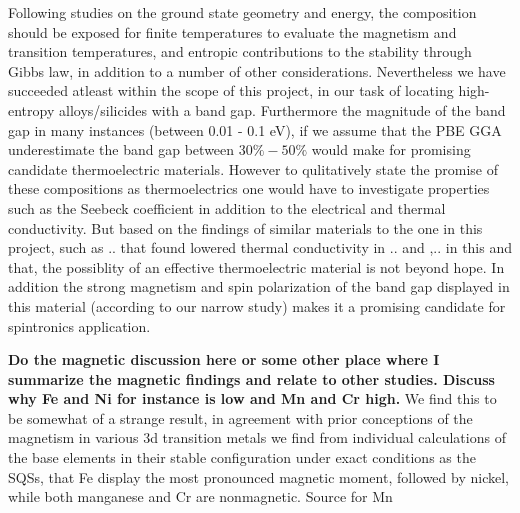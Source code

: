 Following studies on the ground state geometry and energy, the composition should be exposed for finite temperatures to evaluate the magnetism and transition temperatures, and entropic contributions to the stability through Gibbs law, in addition to a number of other considerations. Nevertheless we have succeeded atleast within the scope of this project, in our task of locating high-entropy alloys/silicides with a band gap. Furthermore the magnitude of the band gap in many instances (between 0.01 - 0.1 eV), if we assume that the PBE GGA underestimate the band gap between $30\% - 50\%$ would make for promising candidate thermoelectric materials. However to qulitatively state the promise of these compositions as thermoelectrics one would have to investigate properties such as the Seebeck coefficient in addition to the electrical and thermal conductivity. But based on the findings of similar materials to the one in this project, such as .. that found lowered thermal conductivity in .. and ,.. in this and that, the possiblity of an effective thermoelectric material is not beyond hope. In addition the strong magnetism and spin polarization of the band gap displayed in this material (according to our narrow study) makes it a promising candidate for spintronics application. 


\textbf{Do the magnetic discussion here or some other place where I summarize the magnetic findings and relate to other studies. Discuss why Fe and Ni for instance is low and Mn and Cr high.}
We find this to be somewhat of a strange result, in agreement with prior conceptions of the magnetism in various 3d transition metals we find from individual calculations of the base elements in their stable configuration under exact conditions as the SQSs, that Fe display the most pronounced magnetic moment, followed by nickel, while both manganese and Cr are nonmagnetic. Source for Mn

 